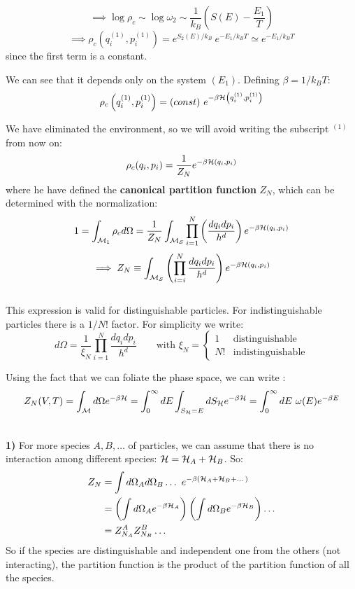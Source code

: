 $$\implies \log \rho_c \sim \log \omega_2 \sim \frac 1{k_B} \left(S(E) - \frac{E_1}T\right)$$
$$ \implies \rho_c \left(q_i^{(1)}, p_i^{(1)}\right) = e^{S_2(E)/k_B} \ e^{-E_1/k_B T} \simeq e^{-E_1/k_B T} $$since the first term is a constant.

We can see that it depends only on the system $(E_1)$. Defining $\beta = 1/k_BT$:
$$ \rho_c \left(q_i^{(1)}, p_i^{(1)}\right) = (const) \ e^{-\beta \mathcal{H}\left(q_i^{(1)}, p_i^{(1)}\right)}$$

We have eliminated the environment, so we will avoid writing the subscript $^{(1)}$ from now on:
$$ \rho_c (q_i,p_i) = \frac 1{Z_N} e^{-\beta\mathcal{H}(q_i,p_i)}$$
where he have defined the \textbf{canonical partition function} $Z_N$, which can be determined with the normalization:
$$ 1 = \int_{\mathcal{M}_1} \rho_c d\Omega = \frac1{Z_N} \int_{\mathcal{M}_{\mathcal{S}}} \prod_{i=1}^N \left(\frac{dq_idp_i}{h^d}\right) e^{-\beta\mathcal{H}(q_i,p_i)}$$
$$ \implies Z_N \equiv \int_{\mathcal{M}_{\mathcal{S}}} \left(\prod_{i=i}^N\frac{dq_idp_i}{h^d}\right) e^{-\beta\mathcal{H}(q_i,p_i)}$$
\\

This expression is valid for distinguishable particles. For indistinguishable particles there is a $1/N!$ factor. For simplicity we write:
$$ d\Omega = \frac 1{\xi_N} \prod_{i=1}^N \frac{dq_idp_i}{h^d} \qquad \text{with }\xi_N = \begin{cases}
    1 & \text{distinguishable} \\
    N! & \text{indistinguishable}
\end{cases}$$

Using the fact that we can foliate the phase space, we can write :
$$ Z_N(V,T) = \int_{\mathcal{M}} d\Omega e^{-\beta\mathcal{H}} = \int_0^\infty dE \int_{S_{\mathcal{H}}=E} dS_{\mathcal{H}} e ^{-\beta\mathcal{H}} = \int_0^\infty dE \ \omega(E) e^{-\beta E}$$

\\

\textbf{1)} For more species $A,B, \dots$ of particles, we can assume that there is no interaction among different species: $ \mathcal{H} = \mathcal{H}_A + \mathcal{H}_B$. So:
\begin{align*}
Z_N &= \int d\Omega_A d\Omega_B \dots \ e^{-\beta(\mathcal{H}_A+ \mathcal{H}_B + \dots)} \\
&= \left(\int d\Omega_A e^{-\beta\mathcal{H}_A}\right)\left(\int d\Omega_B e^{-\beta\mathcal{H}_B}\right)\dots \\
&= Z_{N_A}^A Z_{N_B}^B \dots
\end{align*}
So if the species are distinguishable and independent one from the others (not interacting), the partition function is the product of the partition function of all the species.\\

